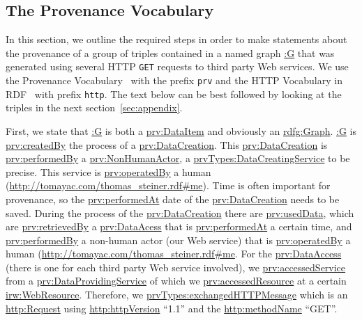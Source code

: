 \documentclass[conference]{IEEEtran}
\begin{document}
\subsection{The Provenance Vocabulary}                                      \label{sec:provenance}
In this section, we outline the required steps in order to make statements about the provenance of a group of triples
contained in a named graph \url{:G} that was generated using several HTTP \texttt{GET} requests to third party Web
services. We use the Provenance Vocabulary~\cite{Hartig:Provenance} with the prefix \texttt{prv} and the HTTP Vocabulary in RDF~\cite{HTTP:RDF} with prefix \texttt{http}. The text below can be best followed by looking at the triples in the next section~\ref{sec:appendix}.

First, we state that \url{:G} is both a \url{prv:DataItem} and obviously an \url{rdfg:Graph}. \url{:G} is
\url{prv:createdBy} the process of a \url{prv:DataCreation}. This \url{prv:DataCreation} is \url{prv:performedBy} a
\url{prv:NonHumanActor}, a \url{prvTypes:DataCreatingService} to be precise. This service is \url{prv:operatedBy} a
human (\url{http://tomayac.com/thomas_steiner.rdf#me}). Time is often important for provenance, so the
\url{prv:performedAt} date of the \url{prv:DataCreation} needs to be saved. During the process of the
\url{prv:DataCreation} there are \url{prv:usedData}, which are \url{prv:retrievedBy} a \url{prv:DataAcess} that is
\url{prv:performedAt} a certain time, and \url{prv:performedBy} a non-human actor (our Web service) that is
\url{prv:operatedBy} a human (\url{http://tomayac.com/thomas_steiner.rdf#me}. For the \url{prv:DataAccess} (there is
one for each third party Web service involved), we \url{prv:accessedService} from a \url{prv:DataProvidingService} of
which we \url{prv:accessedResource} at a certain \url{irw:WebResource}. Therefore, we
\url{prvTypes:exchangedHTTPMessage} which is an \url{http:Request} using \url{http:httpVersion} ``1.1'' and the
\url{http:methodName} ``GET''.
\end{document}
